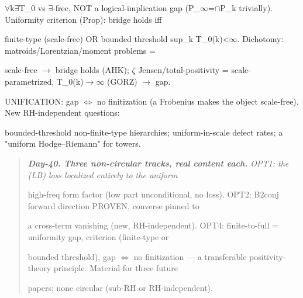 \documentclass[10pt]{article}
\begin{document}
  \ensuremath{\forall}k\ensuremath{\exists}T\_0 vs \ensuremath{\exists}-free, NOT a logical-implication gap (P\_\ensuremath{\infty}=\ensuremath{\cap}P\_k trivially). Uniformity criterion (Prop): bridge holds iff\par
  finite-type (scale-free) OR bounded threshold sup\_k T\_0(k)<\ensuremath{\infty}. Dichotomy: matroids/Lorentzian/moment problems =\par
  scale-free \ensuremath{\to} bridge holds (AHK); \ensuremath{\zeta} Jensen/total-positivity = scale-parametrized, T\_0(k)\ensuremath{\to}\ensuremath{\infty} (GORZ) \ensuremath{\to} gap.\par
  UNIFICATION: gap \ensuremath{\iff} no finitization (a Frobenius makes the object scale-free). New RH-independent questions:\par
  bounded-threshold non-finite-type hierarchies; uniform-in-scale defect rates; a "uniform Hodge--Riemann" for towers.\par

\begin{quote}\itshape
\textbf{Day-40. Three non-circular tracks, real content each.} OPT1: the (LB) loss localized entirely to the uniform\par
high-freq form factor (low part unconditional, no loss). OPT2: B2conj forward direction PROVEN, converse pinned to\par
a cross-term vanishing (new, RH-independent). OPT4: finite-to-full = uniformity gap, criterion (finite-type or\par
bounded threshold), gap \ensuremath{\iff} no finitization --- a transferable positivity-theory principle. Material for three future\par
papers; none circular (sub-RH or RH-independent).\par
\end{quote}
\end{document}
